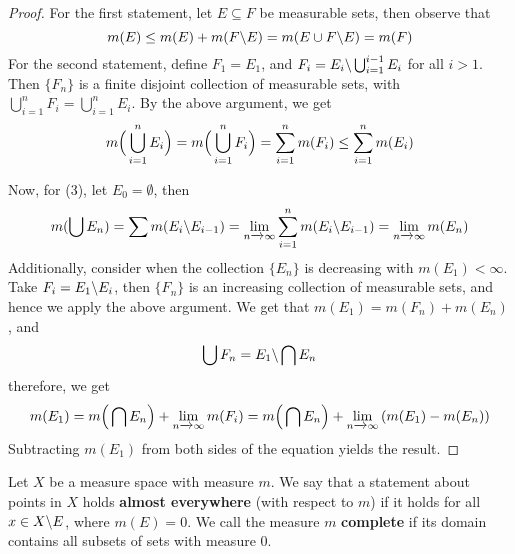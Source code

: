 \begin{proof}
    For the first statement, let $E \subseteq F$ be measurable sets, then
    observe that
    \begin{equation*}
        m(E) \leq m(E)+m(F \backslash E)=m(E \cup F \backslash E)=m(F)
    \end{equation*}
    For the second statement, define $F_1=E_1$, and
    $F_i=E_i \backslash \bigcup_{i=1}^{i-1}{E_i}$ for all $i>1$. Then $\{F_n\}$ is a
    finite disjoint collection of measurable sets, with $\bigcup_{i=1}^n{F_i}
    =\bigcup_{i=1}^n{E_i}$. By the above argument, we get
    \begin{equation*}
        m\Big{(} \bigcup_{i=1}^n{E_i} \Big{)}=m\Big{(} \bigcup_{i=1}^n{F_i} \Big{)}
        =\sum_{i=1}^{n}{m(F_i)} \leq \sum_{i=1}^n{m(E_i)}
    \end{equation*}

    Now, for (3), let $E_0=\emptyset$, then
    \begin{equation*}
            m(\bigcup{E_n})=\sum{m(E_i \backslash E_{i-1})}=
            \lim_{n \xrightarrow{} \infty}{\sum_{i=1}^n{m(E_i \backslash E_{i-1})}}=
            \lim_{n \xrightarrow{} \infty}{m(E_n)}
    \end{equation*}
    Additionally, consider when the collection $\{E_n\}$ is decreasing with
    $m(E_1)<\infty$. Take $F_i=E_1 \backslash E_i$, then $\{F_n\}$ is an increasing
    collection of measurable sets, and hence we apply the above argument. We get
    that $m(E_1)=m(F_n)+m(E_n)$, and
    \begin{equation*}
        \bigcup{F_n}=E_1 \backslash \bigcap{E_n}
    \end{equation*}
    therefore, we get
    \begin{equation*}
        m(E_1)=m\Big{(} \bigcap{E_n} \Big{)}+\lim_{n \xrightarrow{}
        \infty}{m(F_i)}=m\Big{(} \bigcap{E_n} \Big{)}+\lim_{n \xrightarrow{}
        \infty}{(m(E_1)-m(E_n))}
    \end{equation*}
    Subtracting $m(E_1)$ from both sides of the equation yields the result.
\end{proof}

\begin{definition}
    Let $X$ be a measure space with measure $m$. We say that a statement about
    points in $X$ holds  \textbf{almost everywhere} (with respect to $m$) if it
    holds for all $x \in X \backslash E$, where $m(E)=0$. We call the measure $m$
     \textbf{complete} if its domain contains all subsets of sets with measure
     $0$.
\end{definition}

